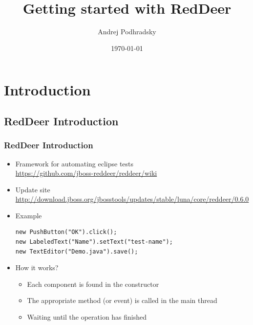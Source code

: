 \documentclass{beamer}
\begin{document}
\title{Getting started with RedDeer}   
\author{Andrej Podhradsky}
\date{\today} 



\frame{\titlepage} 


\section{Introduction}
\subsection{RedDeer Introduction}
\begin{frame}[fragile]
\frametitle{RedDeer Introduction}
\begin{itemize}
\item Framework for automating eclipse tests\\\url{https://github.com/jboss-reddeer/reddeer/wiki}
\item Update site\\\url{http://download.jboss.org/jbosstools/updates/stable/luna/core/reddeer/0.6.0}
\item Example
\begin{lstlisting}
new PushButton("OK").click();
new LabeledText("Name").setText("test-name");
new TextEditor("Demo.java").save();
\end{lstlisting}
\item How it works?
\begin{itemize}
\item Each component is found in the constructor
\item The appropriate method (or event) is called in the main thread
\item Waiting until the operation has finished
\end{itemize}
\end{itemize}
\end{frame}
\end{document}
